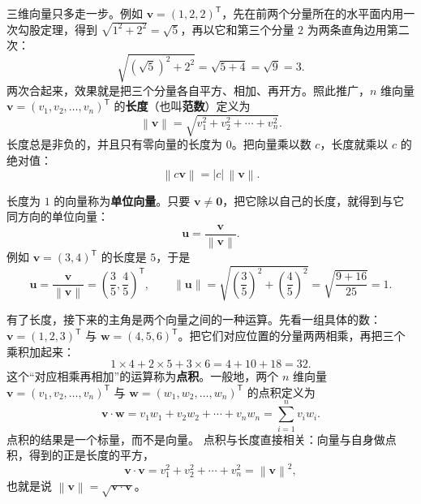 \documentclass[UTF8,a4paper,12pt]{ctexart}
\numberwithin{equation}{section}
\newcommand{\norm}[1]{\left\lVert #1 \right\rVert}
\newcommand{\trans}{^{\mathsf T}}
\begin{document}
	三维向量只多走一步。例如 $\bm{v}=(1,2,2)\trans$，先在前两个分量所在的水平面内用一次勾股定理，得到 $\sqrt{1^2+2^2}=\sqrt{5}$，再以它和第三个分量 $2$ 为两条直角边用第二次：
	\begin{equation}\label{eq:2.2}
	\sqrt{(\sqrt{5})^2+2^2}=\sqrt{5+4}=\sqrt{9}=3.
	\end{equation}
	两次合起来，效果就是把三个分量各自平方、相加、再开方。照此推广，$n$ 维向量 $\bm{v}=(v_1,v_2,\ldots,v_n)\trans$ 的\textbf{长度}（也叫\textbf{范数}）定义为
	\begin{equation}\label{eq:2.3}
	\norm{\bm{v}}=\sqrt{v_1^2+v_2^2+\cdots+v_n^2}.
	\end{equation}
	长度总是非负的，并且只有零向量的长度为 $0$。把向量乘以数 $c$，长度就乘以 $c$ 的绝对值：
	\begin{equation}\label{eq:2.4}
	\norm{c\bm{v}}=|c|\,\norm{\bm{v}}.
	\end{equation}

	长度为 $1$ 的向量称为\textbf{单位向量}。只要 $\bm{v}\neq\bm{0}$，把它除以自己的长度，就得到与它同方向的单位向量：
	\begin{equation}\label{eq:2.5}
	\bm{u}=\frac{\bm{v}}{\norm{\bm{v}}}.
	\end{equation}
	例如 $\bm{v}=(3,4)\trans$ 的长度是 $5$，于是
	\begin{equation}\label{eq:2.6}
	\bm{u}=\frac{\bm{v}}{\norm{\bm{v}}}=\left(\frac{3}{5},\frac{4}{5}\right)\trans,
	\qquad
	\norm{\bm{u}}=\sqrt{\left(\frac{3}{5}\right)^2+\left(\frac{4}{5}\right)^2}=\sqrt{\frac{9+16}{25}}=1.
	\end{equation}

	有了长度，接下来的主角是两个向量之间的一种运算。先看一组具体的数：$\bm{v}=(1,2,3)\trans$ 与 $\bm{w}=(4,5,6)\trans$。把它们对应位置的分量两两相乘，再把三个乘积加起来：
	\begin{equation}\label{eq:2.7}
	1\times 4+2\times 5+3\times 6=4+10+18=32.
	\end{equation}
	这个“对应相乘再相加”的运算称为\textbf{点积}。一般地，两个 $n$ 维向量 $\bm{v}=(v_1,v_2,\ldots,v_n)\trans$ 与 $\bm{w}=(w_1,w_2,\ldots,w_n)\trans$ 的点积定义为
	\begin{equation}\label{eq:2.8}
	\bm{v}\cdot\bm{w}
	=v_1w_1+v_2w_2+\cdots+v_nw_n
	=\sum_{i=1}^{n}v_iw_i.
	\end{equation}
	点积的结果是一个标量，而不是向量。
	点积与长度直接相关：向量与自身做点积，得到的正是长度的平方，
	\begin{equation}\label{eq:2.9}
	\bm{v}\cdot\bm{v}=v_1^2+v_2^2+\cdots+v_n^2=\norm{\bm{v}}^2,
	\end{equation}
	也就是说 $\norm{\bm{v}}=\sqrt{\bm{v}\cdot\bm{v}}$。
\end{document}
